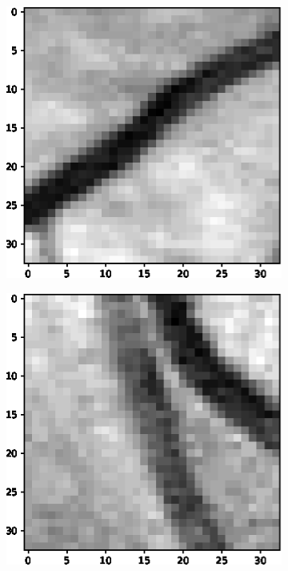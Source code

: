 \documentclass[aps,prb,10pt,twocolumn,groupedaddress]{revtex4-1}
\begin{document}
\begin{figure}[!t]
	\centering
	\begin{subfigure}[]{0.28\textwidth}
		\centering
		\includegraphics[width=\textwidth]{images/positive1.eps}
		\caption{}
	\end{subfigure}
	\hspace{0.5cm}
	\centering
	\begin{subfigure}[]{0.3\textwidth}
		\centering
		\includegraphics[width=\textwidth]{images/positive2.eps}

\end{subfigure}
\end{figure}
\end{document}
